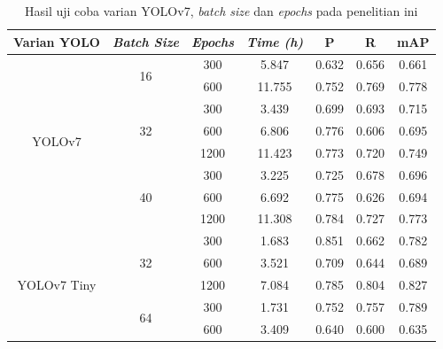 \begin{table}[H]
    \caption{Hasil uji coba varian YOLOv7, \textit{batch size} dan \textit{epochs} pada penelitian ini}
    \centering
    \begin{tabular}{|c|c|c|c|c|c|c|}
        \hline
        Varian YOLO                  & \textit{Batch Size}  & \textit{Epochs} & \textit{Time (h)}  & P     & R     & mAP\\
        \hline
        \multirow{8}{*}{YOLOv7}      & \multirow{2}{*}{16}  & 300             & 5.847              & 0.632 & 0.656 & 0.661\\ \cline{3-7}
                                     &                      & 600             & 11.755             & 0.752 & 0.769 & 0.778\\ \cline{2-7}
                                     & \multirow{3}{*}{32}  & 300             & 3.439              & 0.699 & 0.693 & 0.715\\ \cline{3-7}
                                     &                      & 600             & 6.806              & 0.776 & 0.606 & 0.695\\ \cline{3-7}
                                     &                      & 1200            & 11.423             & 0.773 & 0.720 & 0.749\\ \cline{2-7}
                                     & \multirow{3}{*}{40}  & 300             & 3.225              & 0.725 & 0.678 & 0.696\\ \cline{3-7}
                                     &                      & 600             & 6.692              & 0.775 & 0.626 & 0.694\\ \cline{3-7}
                                     &                      & 1200            & 11.308             & 0.784 & 0.727 & 0.773\\ \cline{2-7}
        \hline
        \multirow{9}{*}{YOLOv7 Tiny} & \multirow{3}{*}{32}  & 300             & 1.683              & 0.851 & 0.662 & 0.782\\ \cline{3-7}
                                     &                      & 600             & 3.521              & 0.709 & 0.644 & 0.689\\ \cline{3-7}
                                     &                      & 1200            & 7.084              & 0.785 & 0.804 & 0.827\\ \cline{2-7}
                                     & \multirow{3}{*}{64}  & 300             & 1.731              & 0.752 & 0.757 & 0.789\\ \cline{3-7}
                                     &                      & 600             & 3.409              & 0.640 & 0.600 & 0.635\\ \cline{3-7}

\end{tabular}
\end{table}
